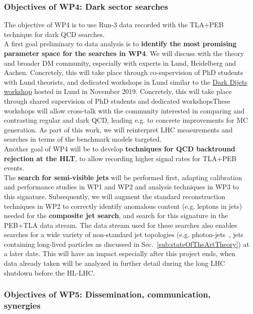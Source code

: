 \subsubsection{Objectives of WP4: Dark sector searches}

The objective of WP4 is to use Run-3 data recorded with the TLA+PEB technique for dark QCD searches. 
\\
A first goal preliminary to data analysis is to \textbf{identify the most promising parameter space for the searches in WP4}. 
We will discuss with the theory and broader DM community, especially with experts in Lund, Heidelberg and Aachen. 
Concretely, this will take place through co-supervision of PhD students with Lund theorists, and dedicated workshops in Lund similar to the \href{https://indico.cern.ch/event/863636/}{Dark Dijets workshop} hosted in Lund in November 2019.
Concretely, this will take place through shared supervision of PhD students and dedicated workshopsThese workshops will allow cross-talk with the community interested in comparing and contrasting regular and dark QCD, leading e.g. to concrete improvements for MC generation. 
As part of this work, we will reinterpret LHC measurements and searches in terms of the benchmark models targeted. 
\\
Another goal of WP4 will be to develop \textbf{techniques for QCD backtround rejection at the HLT}, to allow recording higher signal rates for TLA+PEB events. 
\\
The \textbf{search for semi-visible jets} will be performed first, adapting calibration and performance studies in WP1 and WP2 and analysis techniques in WP3 to this signature. 
Subsequently, we will augment the standard reconstruction techniques in WP2 to correctly identify anomalous content (e.g. leptons in jets) needed for the \textbf{composite jet search}, and search for this signature in the PEB+TLA data stream.  
The data stream used for these searches also enables searches for a wide variety of non-standard jet topologies (e.g. photon-jets~\cite{Ellis:2012sd}, %
jets containing long-lived particles as discussed in Sec.~\ref{sub:stateOfTheArtTheory}) %
at a later date. 
This will have an impact especially after this project ends, when data already taken will be analyzed in further detail during the long LHC shutdown before the HL-LHC. 

\subsubsection{Objectives of WP5: Dissemination, communication, synergies}

